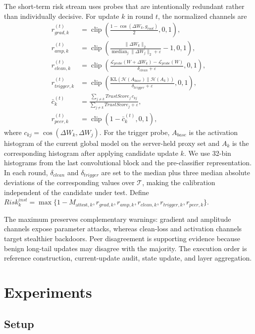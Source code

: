 \documentclass[conference,compsoc]{IEEEtran}
\begin{document}
The short-term risk stream uses probes that are intentionally redundant rather than individually decisive. For update $k$ in round $t$, the normalized channels are
\begin{align}
 r_{grad,k}^{(t)}&=\operatorname{clip}\!\left(\frac{1-\cos(\Delta W_k,g_{root})}{2},0,1\right),\\
 r_{amp,k}^{(t)}&=\operatorname{clip}\!\left(\frac{\|\Delta W_k\|_2}{\operatorname{median}_j\|\Delta W_j\|_2+\varepsilon}-1,0,1\right),\\
 r_{clean,k}^{(t)}&=\operatorname{clip}\!\left(\frac{\mathcal{L}_{probe}(W+\Delta W_k)-\mathcal{L}_{probe}(W)}{\delta_{clean}+\varepsilon},0,1\right),\\
 r_{trigger,k}^{(t)}&=\operatorname{clip}\!\left(\frac{\mathrm{KL}(\mathcal{H}(A_{base})\|\mathcal{H}(A_k))}{\delta_{trigger}+\varepsilon},0,1\right),\\
 \bar c_k^{(t)}&=\frac{\sum_{j\ne k}TrustScore_j\,c_{kj}}{\sum_{j\ne k}TrustScore_j+\varepsilon},\nonumber\\
 r_{peer,k}^{(t)}&=\operatorname{clip}(1-\bar c_k^{(t)},0,1),
\end{align}
where $c_{kj}=\cos(\Delta W_k,\Delta W_j)$. For the trigger probe, $A_{base}$ is the activation histogram of the current global model on the server-held proxy set and $A_k$ is the corresponding histogram after applying candidate update $k$. We use 32-bin histograms from the last convolutional block and the pre-classifier representation. In each round, $\delta_{clean}$ and $\delta_{trigger}$ are set to the median plus three median absolute deviations of the corresponding values over $\mathcal{T}$, making the calibration independent of the candidate under test. Define $Risk_k^{inst}=\max\{1-M_{\text{attest},k},r_{grad,k},r_{amp,k},r_{clean,k},r_{trigger,k},r_{peer,k}\}$.

The maximum preserves complementary warnings: gradient and amplitude channels expose parameter attacks, whereas clean-loss and activation channels target stealthier backdoors. Peer disagreement is supporting evidence because benign long-tail updates may disagree with the majority. The execution order is reference construction, current-update audit, state update, and layer aggregation.

\section{Experiments}

\subsection{Setup}
\end{document}
